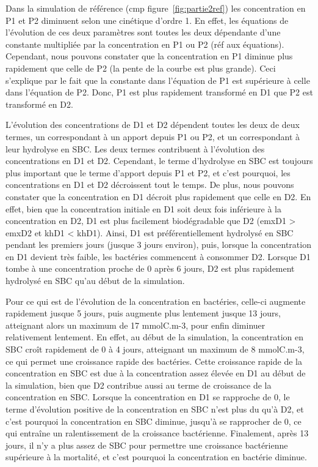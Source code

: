 \par{
Dans la simulation de référence (cmp figure~\ref{fig:partie2ref})
les concentration en P1 et P2 diminuent selon une cin\'etique d'ordre 1. En effet, les \'equations de l'\'evolution de ces deux param\`etres sont toutes les deux d\'ependante d'une constante multipli\'ee par la concentration en P1 ou P2 (r\'ef aux \'equations). Cependant, nous pouvons constater que la concentration en P1 diminue plus rapidement que celle de P2 (la pente de la courbe est plus grande). Ceci s'explique par le fait que la constante dans l'\'equation de P1 est sup\'erieure \`a celle dans l'\'equation de P2. Donc, P1 est plus rapidement transform\'e en D1 que P2 est transform\'e en D2.
}
\par{
L'\'evolution des concentrations de D1 et D2 d\'ependent toutes les deux de deux termes, un correspondant \`a un apport depuis P1 ou P2, et un correspondant \`a leur hydrolyse en SBC. Les deux termes contribuent \`a l'\'evolution des concentrations en D1 et D2. Cependant, le terme d'hydrolyse en SBC est toujours plus important que le terme d'apport depuis P1 et P2, et c'est pourquoi, les concentrations en D1 et D2 d\'ecroissent tout le temps. De plus, nous pouvons constater que la concentration en D1 d\'ecroit plus rapidement que celle en D2. En effet, bien que la concentration initiale en D1 soit deux fois inf\'erieure \`a la concentration en D2, D1 est plus facilement biod\'egradable que D2 (emxD1 > emxD2 et khD1 < khD1). Ainsi, D1 est pr\'ef\'erentiellement hydrolys\'e en SBC pendant les premiers jours (jusque 3 jours environ), puis, lorsque la concentration en D1 devient tr\`es faible, les bact\'eries commencent \`a consommer D2. Lorsque D1 tombe \`a une concentration proche de 0 apr\`es 6 jours, D2 est plus rapidement hydrolys\'e en SBC qu'au d\'ebut de la simulation.
}
\par{
Pour ce qui est de l'\'evolution de la concentration en bact\'eries, celle-ci augmente rapidement jusque 5 jours, puis augmente plus lentement jusque 13 jours, atteignant alors un maximum de 17 mmolC.m-3, pour enfin diminuer relativement lentement. En effet, au d\'ebut de la simulation, la concentration en SBC cro\^it rapidement de 0 \`a 4 jours, atteignant un maximum de 8 mmolC.m-3, ce qui permet une croissance rapide des bact\'eries. Cette croissance rapide de la concentration en SBC est due \`a la concentration assez \'elev\'ee en D1 au d\'ebut de la simulation, bien que D2 contribue aussi au terme de croissance de la concentration en SBC. Lorsque la concentration en D1 se rapproche de 0, le terme d'\'evolution positive de la concentration en SBC n'est plus du qu'\`a D2, et c'est pourquoi la concentration en SBC diminue, jusqu'\`a se rapprocher de 0, ce qui entra\^ine un ralentissement de la croissance bact\'erienne. Finalement, apr\`es 13 jours, il n'y a plus assez de SBC pour permettre une croissance bact\'erienne sup\'erieure \`a la mortalit\'e, et c'est pourquoi la concentration en bact\'erie diminue.
}
